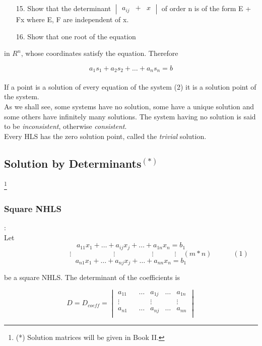 \documentclass[11pt]{amsbook}
\begin{document}
\begin{enumerate}
    	\item[15.]
    	Show that the determinant
    	$\begin{vmatrix}
		a_{ij} & + & x 
		\end{vmatrix}$
		of order n is of the form E + Fx where E, F are independent of x.

		\item[16.]
		Show that one root of the equation
	\end{enumerate}


in \(R^{n}\), whose coordinates satisfy the equation. Therefore

\[a_{1}s_{1}+a_{2}s_{2}+\dots+a_{n}s_{n}=b\]
\\
If a point is a solution of every equation of the system (2) it is a solution point of the system.
\\
As we shall see, some systems have no solution, some have a unique solution and some others have infinitely many solutions. The system having no solution is said to be \textit{inconsistent}, otherwise \textit{consistent}.
\\
Every HLS has the zero solution point, called the \textit{trivial} solution.
\\
\subsection{Solution by Determinants\(^{(*)}\)}
\label{subsec:SolutionbyDeterminants}
\footnote{(*) Solution matrices will be given in Book II.}
\\

\subsubsection{Square NHLS}:
\label{subsubsec:SquareNHLS}
\\

Let  \[a_{11}x_{1}+\dots+a_{ij}x_{j}+\dots+a_{1n}x_{n}=b_{1}\]
\[\quad\quad\quad\quad\quad\quad\quad\quad
\vdots\quad\quad\quad\quad\quad\quad
\vdots\quad\quad\quad\quad\quad\
\vdots\quad\quad\quad\vdots
\quad(m*n)
\quad\quad\quad(1)
\]
\[a_{n1}x_{1}+\dots+a_{nj}x_{j}+\dots+a_{nn}x_{n}=b_{1}\]

be a square NHLS. The determinant of the coefficients is

\[
D=D_{coeff}= \begin{vmatrix} 
    a_{11} &        & \dots  & a_{1j} &  \dots & a_{1n} \\
    \vdots &        &        & \vdots &        & \vdots \\
    a_{n1} &        & \dots  & a_{nj} &  \dots & a_{nn} \\
    \end{vmatrix}
\]
\end{document}
